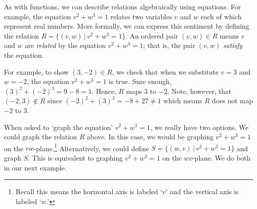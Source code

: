 \documentclass{ximera}
\begin{document}
As with functions, we can describe relations algebraically using equations.  For example, the equation $v^2+w^3 = 1$ relates two variables $v$ and $w$ each of which represent real numbers.  More formally, we can express this sentiment by defining the relation $R = \{ (v,w) \, | \, v^2+w^3 = 1\}$. An ordered pair $(v,w) \in R$ means $v$ and $w$ are  \textit{related} by the equation  $v^2+w^3 = 1$; that is, the pair $(v,w)$ \textit{satisfy} the equation.

\smallskip

For example, to show $(3,-2) \in R$, we check that when we substitute $v=3$ and $w=-2$, the equation $v^2+w^3 = 1$ is true. Sure enough, $(3)^2+(-2)^3 = 9  - 8 = 1$.  Hence, $R$ maps $3$ to $-2$.  Note, however, that $(-2,3) \notin R$ since $(-2)^2+(3)^3 = -8+27 \neq 1$ which means $R$ does not map $-2$ to $3$. 

\smallskip

When asked to `graph the equation'  $v^2+w^3 = 1$,  we really have two options.  We could graph the relation $R$ above.  In this case, we would be graphing $v^2+w^3 = 1$ on the $vw$-plane.\footnote{Recall this means the horizontal axis is labeled `$v$' and the vertical axis is labeled `$w$.'}   Alternatively, we  could define $S = \{ (w,v) \, | \, v^2+w^3 = 1 \}$ and graph $S$. This is equivalent to graphing $v^2+w^3 = 1$ on the $wv$-plane.  We do both in our next example.
\end{document}
